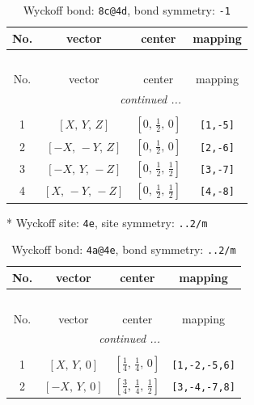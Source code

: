 \documentclass[fleqn,8pt]{jsarticle}
\begin{document}
\begin{longtable}{cccc}
\caption{Wyckoff bond: {\tt 8c@4d}, bond symmetry: {\tt -1}}
 \\
 \hline \hline
No. & vector & center & mapping \\ \hline \endfirsthead

\multicolumn{3}{l}{\tablename\ \thetable{}} \\
 \hline \hline
No. & vector & center & mapping \\ \hline \endhead

 \hline \hline
\multicolumn{3}{r}{\footnotesize\it continued ...} \\ \endfoot

 \hline \hline
\multicolumn{3}{r}{} \\ \endlastfoot

1 & $\left[ X,\, Y,\, Z \right]$ & $\left[ 0,\, \frac{1}{2},\, 0 \right]$ & {\tt [1,-5]} \\ \hline
2 & $\left[ - X,\, - Y,\, Z \right]$ & $\left[ 0,\, \frac{1}{2},\, 0 \right]$ & {\tt [2,-6]} \\ \hline
3 & $\left[ - X,\, Y,\, - Z \right]$ & $\left[ 0,\, \frac{1}{2},\, \frac{1}{2} \right]$ & {\tt [3,-7]} \\ \hline
4 & $\left[ X,\, - Y,\, - Z \right]$ & $\left[ 0,\, \frac{1}{2},\, \frac{1}{2} \right]$ & {\tt [4,-8]} \\
\end{longtable}
* Wyckoff site: {\tt 4e}, site symmetry: {\tt ..2/m}
\renewcommand{\arraystretch}{1.2}
\begin{longtable}{cccc}
\caption{Wyckoff bond: {\tt 4a@4e}, bond symmetry: {\tt ..2/m}}
 \\
 \hline \hline
No. & vector & center & mapping \\ \hline \endfirsthead

\multicolumn{3}{l}{\tablename\ \thetable{}} \\
 \hline \hline
No. & vector & center & mapping \\ \hline \endhead

 \hline \hline
\multicolumn{3}{r}{\footnotesize\it continued ...} \\ \endfoot

 \hline \hline
\multicolumn{3}{r}{} \\ \endlastfoot

1 & $\left[ X,\, Y,\, 0 \right]$ & $\left[ \frac{1}{4},\, \frac{1}{4},\, 0 \right]$ & {\tt [1,-2,-5,6]} \\ \hline
2 & $\left[ - X,\, Y,\, 0 \right]$ & $\left[ \frac{3}{4},\, \frac{1}{4},\, \frac{1}{2} \right]$ & {\tt [3,-4,-7,8]} \\
\end{longtable}
\end{document}
